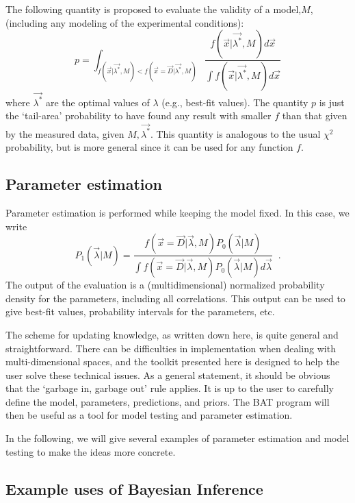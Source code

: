 \documentclass[11pt, a4paper]{article}
\begin{document}
The following quantity is proposed to evaluate the validity of a
model,$M$, (including any modeling of the experimental conditions):
%
\begin{equation}
p=\int_{f(\vec{x}|\vec{\lambda^*},M)<f(\vec{x}=\vec{D}|\vec{\lambda^*},M)} \frac{f(\vec{x}|\vec{\lambda^*},M) d\vec{x}}{\int f(\vec{x}|\vec{\lambda^*},M) d\vec{x}}
\end{equation}
%
where $\vec{\lambda^*}$ are the optimal values of $\lambda$ (e.g.,
best-fit values). The quantity $p$ is just the `tail-area' probability
to have found any result with smaller $f$ than that given by the
measured data, given $M,\vec{\lambda^*}$.  This quantity is analogous
to the usual $\chi^2$ probability, but is more general since it can be
used for any function $f$.

\subsection{Parameter estimation}
%
Parameter estimation is performed while keeping the model fixed.  In
this case, we write
%
\begin{equation}
P_{1}(\vec{\lambda}|M) =\frac{f(\vec{x}=\vec{D}|\vec{\lambda},M) P_{0}(\vec{\lambda}|M)}
{\int f(\vec{x}=\vec{D}|\vec{\lambda},M) P_{0}(\vec{\lambda}|M) d\vec{\lambda}} \;\; .
\label{eqn:BayesTheorem}
\end{equation}
%
The output of the evaluation is a (multidimensional) normalized
probability density for the parameters, including all correlations.
This output can be used to give best-fit values, probability intervals
for the parameters, etc.

The scheme for updating knowledge, as written down here, is quite
general and straightforward.  There can be difficulties in
implementation when dealing with multi-dimensional spaces, and the
toolkit presented here is designed to help the user solve these
technical issues.  As a general statement, it should be obvious that
the `garbage in, garbage out' rule applies.  It is up to the user to
carefully define the model, parameters, predictions, and priors.  The
BAT program will then be useful as a tool for model testing and
parameter estimation.

In the following, we will give several examples of parameter
estimation and model testing to make the ideas more concrete.


\subsection{Example uses of Bayesian Inference} 
\label{subsection:exampleuses} 
\end{document}
